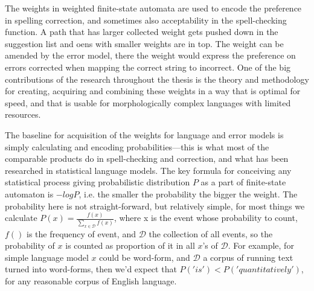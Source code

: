 \documentclass[officiallayout,draft]{unihelcompling}
\begin{document}
The weights in weighted finite-state automata are used to encode the preference
in spelling correction, and sometimes also acceptability in the spell-checking
function. A path that has larger collected weight gets pushed down in the
suggestion list and oens with smaller weights are in top. The weight can be
amended by the error model, there the weight would express the preference on
errors corrected when mapping the correct string to incorrect. One of the big
contributions of the research throughout the thesis is the theory and
methodology for creating, acquiring and combining these weights in a way that
is optimal for speed, and that is usable for morphologically complex languages
with limited resources.

The baseline for acquisition of the weights for language and error models is
simply calculating and encoding probabilities---this is what most of the
comparable products do in spell-checking and correction, and what has been
researched in statistical language models. The key formula for conceiving any
statistical process giving probabilistic distribution $P$ as a part of
finite-state automaton is $-log P$, i.e. the smaller the probability the bigger
the weight. The probability here is not straight-forward, but relatively
simple, for most things we calculate $P(x) = \frac{f(x)}{\sum_{x \in
\mathcal{D}} f(x)}$, where x is the event whose probability to count, $f()$ is
the frequency of event, and $\mathcal{D}$ the collection of all events, so the
probability of $x$ is counted as proportion of it in all $x$'s of
$\mathcal{D}$. For example, for simple language model $x$ could be word-form,
and $\mathcal{D}$ a corpus of running text turned into word-forms, then we'd
expect that $P('is') < P('quantitatively')$, for any reasonable corpus of
English language.
\end{document}

